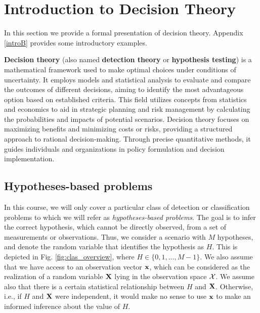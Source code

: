 \section{Introduction to Decision Theory}
\label{sec:SDT}

In this section we provide a formal presentation of decision theory. Appendix \ref{introB} provides some introductory examples.

\textbf{Decision theory} (also named \textbf{detection theory} or \textbf{hypothesis testing}) is a mathematical framework used to make optimal choices under conditions of uncertainty. It employs models and statistical analysis to evaluate and compare the outcomes of different decisions, aiming to identify the most advantageous option based on established criteria. This field utilizes concepts from statistics and economics to aid in strategic planning and risk management by calculating the probabilities and impacts of potential scenarios. Decision theory focuses on maximizing benefits and minimizing costs or risks, providing a structured approach to rational decision-making. Through precise quantitative methods, it guides individuals and organizations in policy formulation and decision implementation.


\subsection{Hypotheses-based problems}
\label{subsec:hypotheses_problems}

In this course, we will only cover a particular class of detection or classification problems to which we will refer as {\em hypotheses-based problems}. The goal is to infer the correct hypothesis, which cannot be directly observed, from a set of measurements or observations.  Thus, we consider a scenario with $M$ hypotheses, and denote the random variable that identifies the hypothesis as $H$. This is depicted in Fig. \ref{fig:clas_overview}, where $H \in \{0, 1, \ldots, M-1\}$. We also assume that we have access to an observation vector $\bf x$, which can be considered as the realization of a random variable $\bf X$ lying in the observation space $\cal X$. We assume also that there is a certain statistical relationship between $H$ and $\bf X$. Otherwise, i.e., if $H$ and $\bf X$ were independent, it would make no sense to use $\bf x$ to make an informed inference about the value of $H$.

